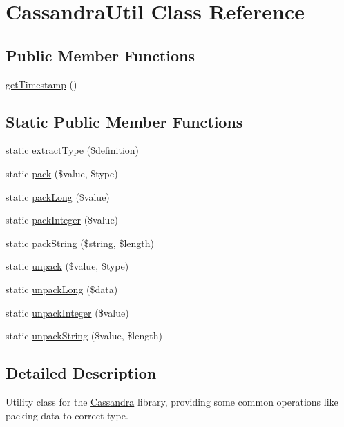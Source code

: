 \hypertarget{classCassandraUtil}{
\section{CassandraUtil Class Reference}
\label{classCassandraUtil}
}
\subsection*{Public Member Functions}
\begin{DoxyCompactItemize}
\item 
\hyperlink{classCassandraUtil_ad5c94f8a7e99e7240385cf471c2b4ae8}{getTimestamp} ()
\end{DoxyCompactItemize}
\subsection*{Static Public Member Functions}
\begin{DoxyCompactItemize}
\item 
static \hyperlink{classCassandraUtil_a0c6545c1306d917051a53598a0f23ee6}{extractType} (\$definition)
\item 
static \hyperlink{classCassandraUtil_aa70ff00c6c785127c87a46c966999e66}{pack} (\$value, \$type)
\item 
static \hyperlink{classCassandraUtil_a92f49d16f99991a04a3f798ee91f7d0b}{packLong} (\$value)
\item 
static \hyperlink{classCassandraUtil_aa5b20568dcda475aba51dc1ac6bdfcb1}{packInteger} (\$value)
\item 
static \hyperlink{classCassandraUtil_a5e6486c8b5438bf565f13789f0403053}{packString} (\$string, \$length)
\item 
static \hyperlink{classCassandraUtil_a0e4efa10d6999de6fbbc2efa3f24a089}{unpack} (\$value, \$type)
\item 
static \hyperlink{classCassandraUtil_a8753dea96e94a3c84d8e5aada1418dbb}{unpackLong} (\$data)
\item 
static \hyperlink{classCassandraUtil_ab0dcf37a5de9d22e665ca291a3afd4a2}{unpackInteger} (\$value)
\item 
static \hyperlink{classCassandraUtil_ab49d399bb60d2e0094de49b77cd00dbe}{unpackString} (\$value, \$length)
\end{DoxyCompactItemize}


\subsection{Detailed Description}
Utility class for the \hyperlink{classCassandra}{Cassandra} library, providing some common operations like packing data to correct type.

